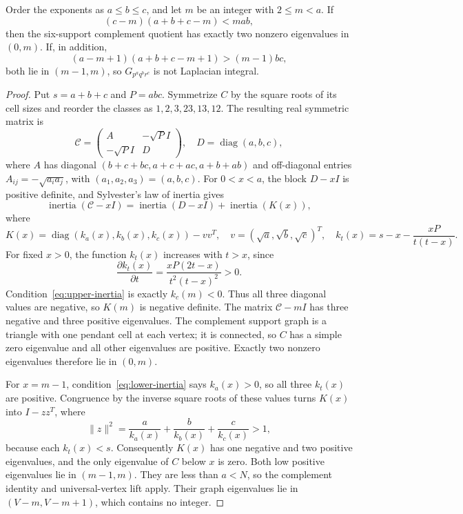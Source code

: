 \begin{proposition}
\label{prop:low-spectrum}
Order the exponents as $a\leq b\leq c$, and let $m$ be an integer
with $2\leq m<a$. If
\begin{equation}
\label{eq:upper-inertia}
(c-m)(a+b+c-m)<mab,
\end{equation}
then the six-support complement quotient has exactly two nonzero
eigenvalues in $(0,m)$. If, in addition,
\begin{equation}
\label{eq:lower-inertia}
(a-m+1)(a+b+c-m+1)>(m-1)bc,
\end{equation}
both lie in $(m-1,m)$, so $G_{p^a q^b r^c}$ is not Laplacian integral.
\end{proposition}

\begin{proof}
Put $s=a+b+c$ and $P=abc$. Symmetrize $C$ by the square roots of its
cell sizes and reorder the classes as $1,2,3,23,13,12$. The resulting
real symmetric matrix is
\[
\mathcal C=\begin{pmatrix}A&-\sqrt P I\\-\sqrt P I&D\end{pmatrix},
\quad D=\operatorname{diag}(a,b,c),
\]
where $A$ has diagonal $(b+c+bc,a+c+ac,a+b+ab)$ and
off-diagonal entries $A_{ij}=-\sqrt{a_i a_j}$, with
$(a_1,a_2,a_3)=(a,b,c)$. For $0<x<a$, the block $D-xI$ is positive
definite, and Sylvester's law of inertia gives
\[
\operatorname{inertia}(\mathcal C-xI)
=\operatorname{inertia}(D-xI)+\operatorname{inertia}(K(x)),
\]
where
\[
K(x)=\operatorname{diag}(k_a(x),k_b(x),k_c(x))-vv^T,
\quad v=(\sqrt a,\sqrt b,\sqrt c)^T,
\quad k_t(x)=s-x-\frac{xP}{t(t-x)}.
\]
For fixed $x>0$, the function $k_t(x)$ increases with $t>x$, since
\[
\frac{\partial k_t(x)}{\partial t}
=\frac{xP(2t-x)}{t^2(t-x)^2}>0.
\]
Condition~\eqref{eq:upper-inertia} is exactly $k_c(m)<0$.
Thus all three diagonal values are negative, so $K(m)$ is negative
definite. The matrix $\mathcal C-mI$ has three negative and three
positive eigenvalues. The complement support graph is a triangle with
one pendant cell at each vertex; it is connected, so $C$ has a simple
zero eigenvalue and all other eigenvalues are positive. Exactly two
nonzero eigenvalues therefore lie in $(0,m)$.

For $x=m-1$, condition~\eqref{eq:lower-inertia} says $k_a(x)>0$,
so all three $k_t(x)$ are positive. Congruence by the inverse square
roots of these values turns $K(x)$ into $I-zz^T$, where
\[
\|z\|^2=\frac{a}{k_a(x)}+\frac{b}{k_b(x)}+\frac{c}{k_c(x)}>1,
\]
because each $k_t(x)<s$. Consequently $K(x)$ has one negative and two
positive eigenvalues, and the only eigenvalue of $C$ below $x$ is zero.
Both low positive eigenvalues lie in $(m-1,m)$. They are less than
$a<N$, so the complement identity and universal-vertex lift apply.
Their graph eigenvalues lie in $(V-m,V-m+1)$, which contains no integer.
\end{proof}

